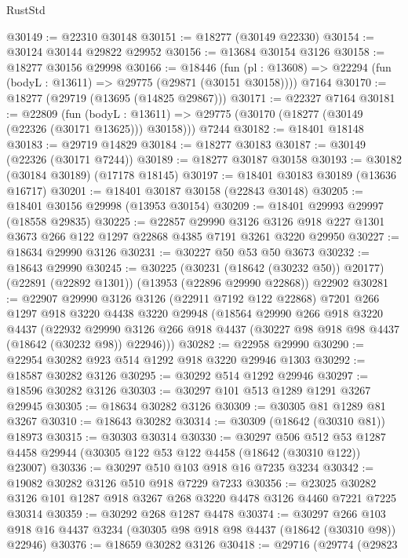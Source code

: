 \begin{lexlean}{RustStd}
\begin{coremodule}
@30149 := @22310 @30148
@30151 := @18277 (@30149 @22330)
@30154 := @30124 @30144 @29822 @29952
@30156 := @13684 @30154 @3126
@30158 := @18277 @30156 @29998
@30166 := @18446
    (fun (pl : @13608) => @22294 (fun (bodyL : @13611) => @29775 (@29871 (@30151 @30158))))
    @7164
@30170 := @18277 (@29719 (@13695 (@14825 @29867)))
@30171 := @22327 @7164
@30181 := @22809
    (fun (bodyL : @13611) => @29775 (@30170 (@18277 (@30149 (@22326 (@30171 @13625))) @30158)))
    @7244
@30182 := @18401 @18148
@30183 := @29719 @14829
@30184 := @18277 @30183
@30187 := @30149 (@22326 (@30171 @7244))
@30189 := @18277 @30187 @30158
@30193 := @30182 (@30184 @30189) (@17178 @18145)
@30197 := @18401 @30183 @30189 (@13636 @16717)
@30201 := @18401 @30187 @30158 (@22843 @30148)
@30205 := @18401 @30156 @29998 (@13953 @30154)
@30209 := @18401 @29993 @29997 (@18558 @29835)
@30225 := @22857
    @29990
    @3126
    @3126
    @918
    @227
    @1301
    @3673
    @266
    @122
    @1297
    @22868
    @4385
    @7191
    @3261
    @3220
    @29950
@30227 := @18634 @29990 @3126
@30231 := @30227 @50 @53 @50 @3673
@30232 := @18643 @29990
@30245 := @30225
    (@30231 (@18642 (@30232 @50)) @20177)
    (@22891 (@22892 @1301))
    (@13953 (@22896 @29990 @22868))
    @22902
@30281 := @22907
    @29990
    @3126
    @3126
    (@22911 @7192 @122 @22868)
    @7201
    @266
    @1297
    @918
    @3220
    @4438
    @3220
    @29948
    (@18564
      @29990
      @266
      @918
      @3220
      @4437
      (@22932
        @29990
        @3126
        @266
        @918
        @4437
        (@30227 @98 @918 @98 @4437 (@18642 (@30232 @98)) @22946)))
@30282 := @22958 @29990
@30290 := @22954 @30282 @923 @514 @1292 @918 @3220 @29946 @1303
@30292 := @18587 @30282 @3126
@30295 := @30292 @514 @1292 @29946
@30297 := @18596 @30282 @3126
@30303 := @30297 @101 @513 @1289 @1291 @3267 @29945
@30305 := @18634 @30282 @3126
@30309 := @30305 @81 @1289 @81 @3267
@30310 := @18643 @30282
@30314 := @30309 (@18642 (@30310 @81)) @18973
@30315 := @30303 @30314
@30330 := @30297
    @506
    @512
    @53
    @1287
    @4458
    @29944
    (@30305 @122 @53 @122 @4458 (@18642 (@30310 @122)) @23007)
@30336 := @30297 @510 @103 @918 @16 @7235 @3234
@30342 := @19082 @30282 @3126 @510 @918 @7229 @7233
@30356 := @23025 @30282 @3126 @101 @1287 @918 @3267 @268 @3220 @4478 @3126 @4460 @7221 @7225 @30314
@30359 := @30292 @268 @1287 @4478
@30374 := @30297
    @266
    @103
    @918
    @16
    @4437
    @3234
    (@30305 @98 @918 @98 @4437 (@18642 (@30310 @98)) @22946)
@30376 := @18659 @30282 @3126
@30418 := @29716
    (@29774
      (@29823

\end{coremodule}
\end{lexlean}
